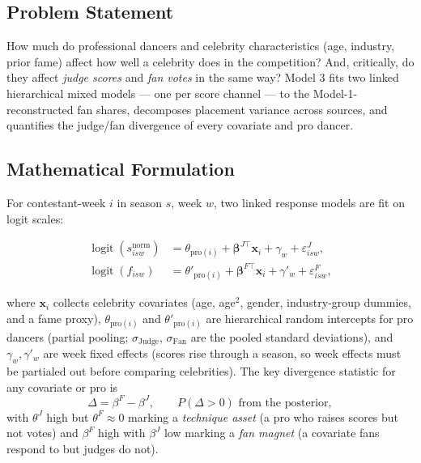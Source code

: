 \documentclass[11pt]{article}
\begin{document}
\subsection{Problem Statement}

How much do professional dancers and celebrity characteristics (age,
industry, prior fame) affect how well a celebrity does in the
competition? And, critically, do they affect \emph{judge scores} and
\emph{fan votes} in the same way? Model 3 fits two linked hierarchical
mixed models --- one per score channel --- to the Model-1-reconstructed
fan shares, decomposes placement variance across sources, and quantifies
the judge/fan divergence of every covariate and pro dancer.

\subsection{Mathematical Formulation}

For contestant-week $i$ in season $s$, week $w$, two linked response
models are fit on logit scales:

\begin{align}
\operatorname{logit}(s^{\text{norm}}_{isw})
  &= \theta_{\text{pro}(i)} + \boldsymbol{\beta}^{J \top} \mathbf{x}_i
     + \gamma_w + \varepsilon^{J}_{isw}, \label{eq:judge} \\
\operatorname{logit}(f_{isw})
  &= \theta'_{\text{pro}(i)} + \boldsymbol{\beta}^{F \top} \mathbf{x}_i
     + \gamma'_w + \varepsilon^{F}_{isw}, \label{eq:fan}
\end{align}

where $\mathbf{x}_i$ collects celebrity covariates (age, age$^2$, gender,
industry-group dummies, and a fame proxy), $\theta_{\text{pro}(i)}$ and
$\theta'_{\text{pro}(i)}$ are hierarchical random intercepts for pro
dancers (partial pooling; $\sigma_{\text{Judge}}$, $\sigma_{\text{Fan}}$
are the pooled standard deviations), and $\gamma_w, \gamma'_w$ are week
fixed effects (scores rise through a season, so week effects must be
partialed out before comparing celebrities). The key divergence statistic
for any covariate or pro is
\begin{equation}
\Delta = \beta^{F} - \beta^{J}, \qquad
P(\Delta > 0) \text{ from the posterior},
\label{eq:delta}
\end{equation}
with $\theta^{J}$ high but $\theta^{F} \approx 0$ marking a
\emph{technique asset} (a pro who raises scores but not votes) and
$\beta^F$ high with $\beta^J$ low marking a \emph{fan magnet} (a
covariate fans respond to but judges do not).
\end{document}
